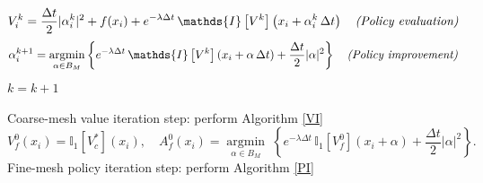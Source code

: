 \documentclass[12pt]{amsart}
\DeclareMathOperator*{\argmin}{argmin}
\numberwithin{equation}{section}
\theoremstyle{plain}
\begin{document}
\begin{algorithm}[H]\label{PI}
\SetAlgoLined
{}
{
    {
    \begin{equation*}
         V_i^k = \frac{\Delta t}{2}|\alpha_{i}^{k}|^{2} + f(x_{i}) + e^{-\lambda \Delta t} \,\mathds{I}\left[V^k\right]\left(x_i+\alpha_{i}^{k}\,\Delta t \right)
    \quad\text{\it (Policy evaluation)}\end{equation*}
    }
    {
    \begin{equation*}
        \alpha_i^{k+1} =  \argmin\limits_{\alpha\in B_M} \left\{   e^{-\lambda \Delta t}\, \mathds{I}\left[V^k\right](x_i+\alpha\,\Delta t) + \frac{\Delta t}{2}|\alpha|^{2}\right\}\quad\text{\it (Policy improvement)}
    \end{equation*}
    }
    $k=k+1$
}
\caption{Policy Iteration for infinite horizon optimal control \textbf{(PI)}}
\end{algorithm}

\begin{algorithm}[H]
\SetAlgoLined
{}
\Begin
{
    Coarse-mesh value iteration step: perform Algorithm \ref{VI}\\
    {
        \begin{equation*}
            V^{0}_{f}(x_i) =\mathds{I}_1[V^*_c](x_i), \quad A^{0}_{f}(x_i)  =\argmin\limits_{\alpha\in B_M}\;\left\{e^{-\lambda \Delta t}\, \mathds{I}_1 \left[V^{0}_{f}\right](x_i+\alpha)+ \frac{\Delta t}{2}|\alpha|^{2} \right\}.
        \end{equation*}
    }
    Fine-mesh policy iteration step: perform Algorithm \ref{PI}\\
}
\caption{Accelerated Policy Iteration \textbf{(API)}}
\end{algorithm}





\end{document}
